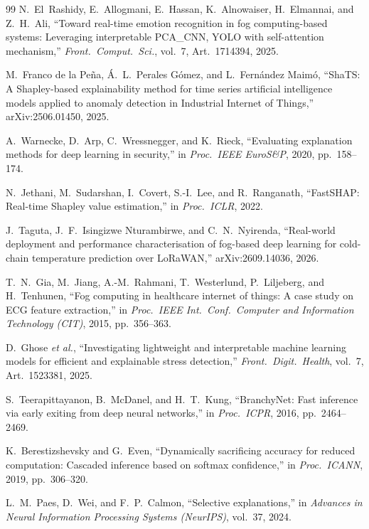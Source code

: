 \documentclass[conference]{IEEEtran}
\begin{document}
\begin{thebibliography}{99}
N.~El~Rashidy, E.~Allogmani, E.~Hassan, K.~Alnowaiser, H.~Elmannai, and
Z.~H.~Ali, ``Toward real-time emotion recognition in fog computing-based
systems: Leveraging interpretable PCA\_CNN, YOLO with self-attention
mechanism,'' \emph{Front.\ Comput.\ Sci.}, vol.~7, Art.~1714394, 2025.

M.~Franco de la Pe\~na, \'A.~L.~Perales G\'omez, and
L.~Fern\'andez Maim\'o, ``ShaTS: A Shapley-based explainability method for
time series artificial intelligence models applied to anomaly detection in
Industrial Internet of Things,'' arXiv:2506.01450, 2025.

A.~Warnecke, D.~Arp, C.~Wressnegger, and K.~Rieck, ``Evaluating explanation
methods for deep learning in security,'' in \emph{Proc.\ IEEE EuroS\&P},
2020, pp.~158--174.

N.~Jethani, M.~Sudarshan, I.~Covert, S.-I.~Lee, and R.~Ranganath,
``FastSHAP: Real-time Shapley value estimation,'' in \emph{Proc.\ ICLR},
2022.

J.~Taguta, J.~F.~Isingizwe Nturambirwe, and C.~N.~Nyirenda, ``Real-world
deployment and performance characterisation of fog-based deep learning for
cold-chain temperature prediction over LoRaWAN,'' arXiv:2609.14036, 2026.

T.~N.~Gia, M.~Jiang, A.-M.~Rahmani, T.~Westerlund, P.~Liljeberg, and
H.~Tenhunen, ``Fog computing in healthcare internet of things: A case
study on ECG feature extraction,'' in \emph{Proc.\ IEEE Int.\ Conf.\
Computer and Information Technology (CIT)}, 2015, pp.~356--363.

D.~Ghose \emph{et al.}, ``Investigating lightweight and interpretable
machine learning models for efficient and explainable stress detection,''
\emph{Front.\ Digit.\ Health}, vol.~7, Art.~1523381, 2025.

S.~Teerapittayanon, B.~McDanel, and H.~T.~Kung, ``BranchyNet: Fast
inference via early exiting from deep neural networks,'' in \emph{Proc.\
ICPR}, 2016, pp.~2464--2469.

K.~Berestizshevsky and G.~Even, ``Dynamically sacrificing accuracy for
reduced computation: Cascaded inference based on softmax confidence,'' in
\emph{Proc.\ ICANN}, 2019, pp.~306--320.

L.~M.~Paes, D.~Wei, and F.~P.~Calmon, ``Selective explanations,'' in
\emph{Advances in Neural Information Processing Systems (NeurIPS)}, vol.~37,
2024.


\end{thebibliography}
\end{document}
